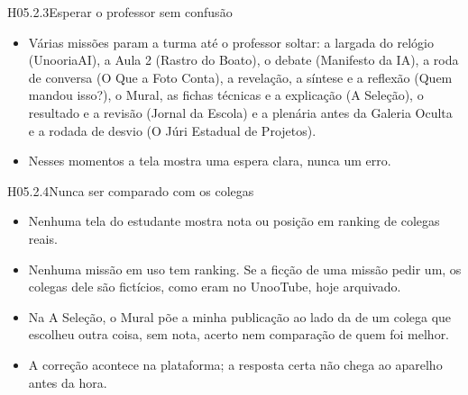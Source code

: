 \begin{historia}{H05.2.3}{Esperar o professor sem confusão}{\pronto}
\aceite
\begin{itemize}
  \item Várias missões param a turma até o professor soltar: a largada do
    relógio (UnooriaAI), a Aula 2 (Rastro do Boato), o debate
    (Manifesto da IA), a roda de conversa (O Que a Foto Conta), a revelação,
    a síntese e a reflexão (Quem mandou isso?), o Mural, as fichas técnicas e
    a explicação (A Seleção), o resultado e a revisão (Jornal da Escola) e a
    plenária antes da Galeria Oculta e a rodada de desvio (O Júri Estadual
    de Projetos).
  \item Nesses momentos a tela mostra uma espera clara, nunca um erro.
\end{itemize}
\end{historia}

\begin{historia}{H05.2.4}{Nunca ser comparado com os colegas}{\pronto}
\aceite
\begin{itemize}
  \item Nenhuma tela do estudante mostra nota ou posição em ranking de
    colegas reais.
  \item Nenhuma missão em uso tem ranking. Se a ficção de uma missão pedir um,
    os colegas dele são fictícios, como eram no UnooTube, hoje arquivado.
  \item Na A Seleção, o Mural põe a minha publicação ao lado da de um colega
    que escolheu outra coisa, sem nota, acerto nem comparação de quem foi
    melhor.
  \item A correção acontece na plataforma; a resposta certa não chega ao
    aparelho antes da hora.
\end{itemize}
\end{historia}
